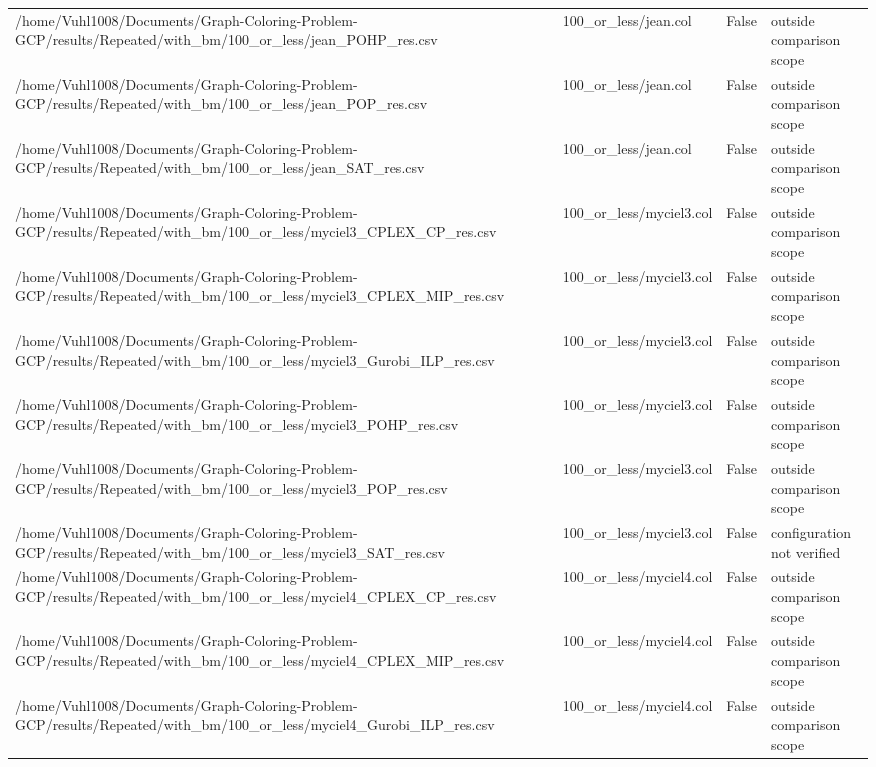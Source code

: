 \begin{table}[htbp]
\begin{tabular}{llll}
/home/Vuhl1008/Documents/Graph-Coloring-Problem-GCP/results/Repeated/with\_bm/100\_or\_less/jean\_POHP\_res.csv & 100\_or\_less/jean.col & False & outside comparison scope \\
/home/Vuhl1008/Documents/Graph-Coloring-Problem-GCP/results/Repeated/with\_bm/100\_or\_less/jean\_POP\_res.csv & 100\_or\_less/jean.col & False & outside comparison scope \\
/home/Vuhl1008/Documents/Graph-Coloring-Problem-GCP/results/Repeated/with\_bm/100\_or\_less/jean\_SAT\_res.csv & 100\_or\_less/jean.col & False & outside comparison scope \\
/home/Vuhl1008/Documents/Graph-Coloring-Problem-GCP/results/Repeated/with\_bm/100\_or\_less/myciel3\_CPLEX\_CP\_res.csv & 100\_or\_less/myciel3.col & False & outside comparison scope \\
/home/Vuhl1008/Documents/Graph-Coloring-Problem-GCP/results/Repeated/with\_bm/100\_or\_less/myciel3\_CPLEX\_MIP\_res.csv & 100\_or\_less/myciel3.col & False & outside comparison scope \\
/home/Vuhl1008/Documents/Graph-Coloring-Problem-GCP/results/Repeated/with\_bm/100\_or\_less/myciel3\_Gurobi\_ILP\_res.csv & 100\_or\_less/myciel3.col & False & outside comparison scope \\
/home/Vuhl1008/Documents/Graph-Coloring-Problem-GCP/results/Repeated/with\_bm/100\_or\_less/myciel3\_POHP\_res.csv & 100\_or\_less/myciel3.col & False & outside comparison scope \\
/home/Vuhl1008/Documents/Graph-Coloring-Problem-GCP/results/Repeated/with\_bm/100\_or\_less/myciel3\_POP\_res.csv & 100\_or\_less/myciel3.col & False & outside comparison scope \\
/home/Vuhl1008/Documents/Graph-Coloring-Problem-GCP/results/Repeated/with\_bm/100\_or\_less/myciel3\_SAT\_res.csv & 100\_or\_less/myciel3.col & False & configuration not verified \\
/home/Vuhl1008/Documents/Graph-Coloring-Problem-GCP/results/Repeated/with\_bm/100\_or\_less/myciel4\_CPLEX\_CP\_res.csv & 100\_or\_less/myciel4.col & False & outside comparison scope \\
/home/Vuhl1008/Documents/Graph-Coloring-Problem-GCP/results/Repeated/with\_bm/100\_or\_less/myciel4\_CPLEX\_MIP\_res.csv & 100\_or\_less/myciel4.col & False & outside comparison scope \\
/home/Vuhl1008/Documents/Graph-Coloring-Problem-GCP/results/Repeated/with\_bm/100\_or\_less/myciel4\_Gurobi\_ILP\_res.csv & 100\_or\_less/myciel4.col & False & outside comparison scope \\

\end{tabular}
\end{table}
